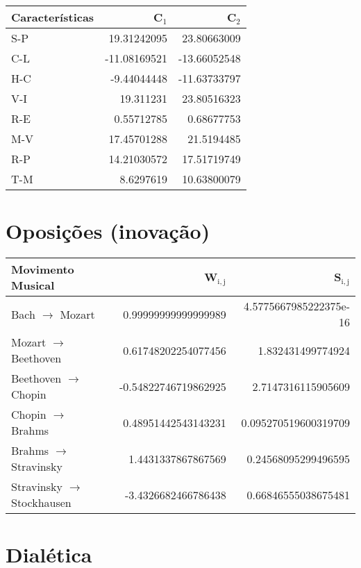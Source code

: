 \documentclass[11pt]{article}
\begin{document}
\begin{center}
\begin{tabular}{lrr}
 Características  &         C$_1$  &         C$_2$  \\
\hline
 S-P              &   19.31242095  &   23.80663009  \\
 C-L              &  -11.08169521  &  -13.66052548  \\
 H-C              &   -9.44044448  &  -11.63733797  \\
 V-I              &     19.311231  &   23.80516323  \\
 R-E              &    0.55712785  &    0.68677753  \\
 M-V              &   17.45701288  &    21.5194485  \\
 R-P              &   14.21030572  &   17.51719749  \\
 T-M              &     8.6297619  &   10.63800079  \\
\end{tabular}
\end{center}
\section{Oposições (inovação)}
\label{sec-6}



\begin{center}
\begin{tabular}{lrr}
 Movimento Musical             &    W$_{\mathrm{i,j}}$  &      S$_{\mathrm{i,j}}$  \\
\hline
 Bach $\to$ Mozart             &   0.99999999999999989  &  4.5775667985222375e-16  \\
 Mozart $\to$ Beethoven        &   0.61748202254077456  &       1.832431499774924  \\
 Beethoven $\to$ Chopin        &  -0.54822746719862925  &      2.7147316115905609  \\
 Chopin $\to$ Brahms           &   0.48951442543143231  &    0.095270519600319709  \\
 Brahms $\to$ Stravinsky       &    1.4431337867867569  &     0.24568095299496595  \\
 Stravinsky $\to$ Stockhausen  &   -3.4326682466786438  &     0.66846555038675481  \\
\end{tabular}
\end{center}
\section{Dialética}
\label{sec-7}
\end{document}
